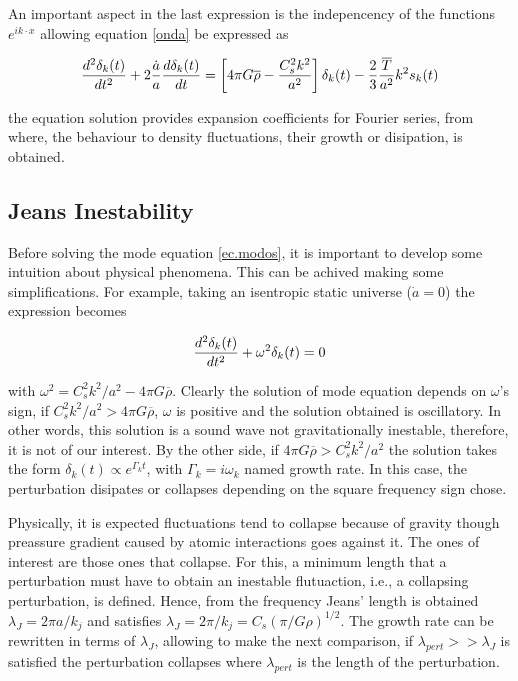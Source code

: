An important aspect in the last expression is the indepencency of the 
functions $e^{ik\cdot x}$ allowing equation \ref{onda} be expressed as 

\begin{equation}
\frac{d^2\delta_k(t)}{dt^2}+2\frac{\dot{a}}{a}\frac{d \delta_k(t)}{d t} = 
\left[4\pi G\overline{\rho}-\frac{C_s^2 k^2}{a^2}\right]\delta_k(t)
-\frac{2}{3}\frac{\overline{T}}{a^2}k^2s_k(t)
\label{ec.modos}
\end{equation}

the equation solution provides expansion coefficients for Fourier series,
from where, the behaviour to density fluctuations, their growth or 
disipation, is obtained. 

\subsection{ Jeans Inestability}

Before solving the mode equation \ref{ec.modos}, it is important to develop
some intuition about physical phenomena. This can be achived making some 
simplifications. For example, taking an isentropic static universe ($\dot{a}=0$)
the expression becomes

\[
\frac{d^2\delta_k(t)}{dt^2} +
\omega^2\delta_k(t) = 0
\]

with $\omega^2 = C_s^2k^2/a^2-4\pi G\overline{\rho}$. Clearly the solution of mode 
equation depends on $\omega$'s sign, if $C_s^2k^2/a^2>4\pi G\overline{\rho}$,  
$\omega$ is positive and the solution obtained is oscillatory. In other words, 
this solution is a sound wave not gravitationally inestable, therefore, it is
not of our interest. 
By the other side, if $4\pi G\overline{\rho}>C_s^2k^2/a^2$ the solution takes
the form $\delta_k(t)\propto e^{\Gamma_k t}$, with $\Gamma_k=i\omega_k$ named
growth rate. In this case, the perturbation disipates or collapses depending
on the square frequency sign chose. 

Physically, it is expected fluctuations tend to collapse 
because of gravity though preassure gradient caused by atomic
interactions goes against it. The ones of interest are those
ones that collapse. For this, a minimum length that a perturbation
must have to obtain an inestable flutuaction, i.e., a collapsing
perturbation, is defined. Hence, from the frequency Jeans' length
is obtained $\lambda_J = 2\pi a/k_j$ and satisfies 
$\lambda_J = 2\pi/k_j = C_s(\pi/G\rho)^{1/2}$.
The growth rate can be rewritten in terms of $\lambda_J$, 
allowing to make the next comparison, if $\lambda_{pert}>>\lambda_J$
is satisfied the perturbation collapses where $\lambda_{pert}$
is the length of the perturbation.



